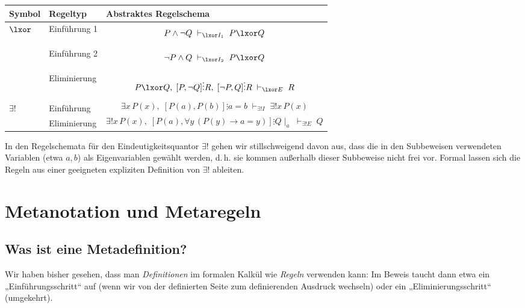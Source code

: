 \documentclass[main.tex]{subfiles}
\begin{document}
\begin{center}
\renewcommand{\arraystretch}{1.25}
\begin{tabularx}{\textwidth}{@{}llX@{}}
\toprule
Symbol & Regeltyp & Abstraktes Regelschema \\ 
\midrule
$\lxor$
  & \label{rule:XOrI1}Einführung 1 
  & \[
      P \land \neg Q \;\vdash_{\lxor I_1}\; P \lxor Q
    \] \\[0.6ex]
  & \label{rule:XOrI2}Einführung 2
  & \[
      \neg P \land Q \;\vdash_{\lxor I_2}\; P \lxor Q
    \] \\[0.6ex]
  & \label{rule:XOrE}Eliminierung
  & \[
      P \lxor Q,\; [P,\neg Q]\vdots R,\; [\neg P,Q]\vdots R
      \;\vdash_{\lxor E}\; R
    \] \\[0.8ex]
$\exists!$
  & \label{rule:UEI}Einführung
  & \[
      \exists x\,P(x),\;
      [P(a),P(b)]\vdots a = b
      \;\vdash_{\exists! I}\; \exists! x\,P(x)
    \] \\[0.8ex]
  & \label{rule:UEE}Eliminierung
  & \[
      \exists! x\,P(x),\;
      [P(a),\forall y\,(P(y)\rightarrow a=y)]\vdots Q\mid_a
      \;\vdash_{\exists! E}\; Q
    \] \\
\bottomrule
\end{tabularx}
\end{center}
\begin{remark}
In den Regelschemata für den Eindeutigkeitsquantor \(\exists!\) gehen
wir stillschweigend davon aus, dass die in den Subbeweisen verwendeten
Variablen (etwa \(a,b\)) als Eigenvariablen gewählt werden, d.\,h. sie
kommen außerhalb dieser Subbeweise nicht frei vor. Formal lassen sich
die Regeln aus einer geeigneten expliziten Definition von \(\exists!\)
ableiten.
\end{remark}




\section{Metanotation und Metaregeln}

\subsection{Was ist eine Metadefinition?}

Wir haben bisher gesehen, dass man \emph{Definitionen} im formalen
Kalkül wie \emph{Regeln} verwenden kann: Im Beweis taucht dann etwa
ein „Einführungsschritt“ auf (wenn wir von der definierten Seite zum
definierenden Ausdruck wechseln) oder ein „Eliminierungsschritt“
(umgekehrt).
\end{document}
